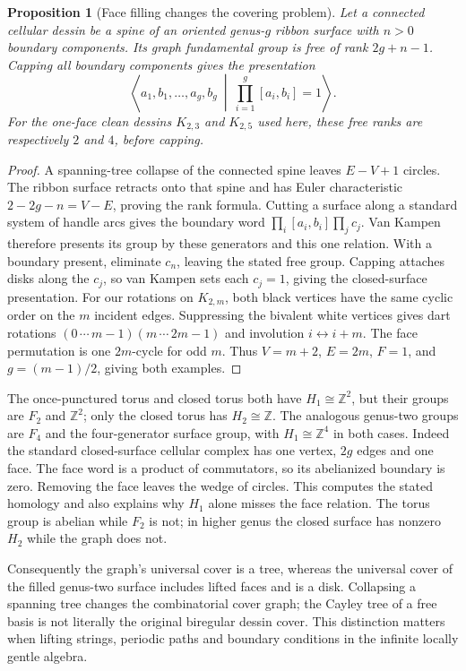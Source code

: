 \documentclass[11pt,oneside,openany]{book}
\newtheorem{proposition}[theorem]{Proposition}
\theoremstyle{definition}\newtheorem{definition}[theorem]{Definition}
\theoremstyle{remark}\newtheorem{remark}[theorem]{Remark}
\begin{document}
\begin{proposition}[Face filling changes the covering problem]
Let a connected cellular dessin be a spine of an oriented genus-$g$ ribbon
surface with $n>0$ boundary components. Its graph fundamental group is free
of rank $2g+n-1$. Capping all boundary components gives the presentation
\[
 \left\langle a_1,b_1,\ldots,a_g,b_g\ \middle|\
       \prod_{i=1}^g[a_i,b_i]=1\right\rangle.
\]
For the one-face clean dessins $K_{2,3}$ and $K_{2,5}$ used here, these free
ranks are respectively $2$ and $4$, before capping.
\end{proposition}
\begin{proof}
A spanning-tree collapse of the connected spine leaves $E-V+1$ circles.
The ribbon surface retracts onto that spine and has Euler characteristic
$2-2g-n=V-E$, proving the rank formula. Cutting a surface along a standard
system of handle arcs gives the boundary word
$\prod_i[a_i,b_i]\prod_jc_j$. Van Kampen therefore presents its group by
these generators and this one relation. With a boundary present, eliminate
$c_n$, leaving the stated free group. Capping attaches disks along the $c_j$,
so van Kampen sets each $c_j=1$, giving the closed-surface presentation.
For our rotations on $K_{2,m}$, both black vertices have the same cyclic
order on the $m$ incident edges. Suppressing the bivalent white vertices
gives dart rotations $(0\,\cdots\,m-1)(m\,\cdots\,2m-1)$ and involution
$i\leftrightarrow i+m$. The face permutation is one $2m$-cycle for odd $m$.
Thus $V=m+2$, $E=2m$, $F=1$, and $g=(m-1)/2$, giving both examples.
\end{proof}

The once-punctured torus and closed torus both have $H_1\cong\mathbb Z^2$,
but their groups are $F_2$ and $\mathbb Z^2$; only the closed torus has
$H_2\cong\mathbb Z$. The analogous genus-two groups are $F_4$ and the
four-generator surface group, with $H_1\cong\mathbb Z^4$ in both cases.
Indeed the standard closed-surface cellular complex has one vertex,
$2g$ edges and one face. The face word is a product of commutators, so its
abelianized boundary is zero. Removing the face leaves the wedge of circles.
This computes the stated homology and also explains why $H_1$ alone misses
the face relation. The torus group is abelian while $F_2$ is not; in higher
genus the closed surface has nonzero $H_2$ while the graph does not.

Consequently the graph's universal cover is a tree, whereas the universal
cover of the filled genus-two surface includes lifted faces and is a disk.
Collapsing a spanning tree changes the combinatorial cover graph; the Cayley
tree of a free basis is not literally the original biregular dessin cover.
This distinction matters when lifting strings, periodic paths and boundary
conditions in the infinite locally gentle algebra.
\end{document}
